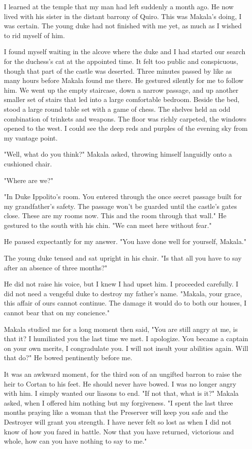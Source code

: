 \documentclass{article}
\begin{document}
I learned at the temple that my man had left suddenly a month ago. He now lived with his sister in the distant barrony of Quiro. This was Makala's doing, I was certain. The young duke had not finished with me yet, as much as I wished to rid myself of him. 

I found myself waiting in the alcove where the duke and I had started our search for the duchess's cat at the appointed time. It felt too public and conspicuous, though that part of the castle was deserted. Three minutes passed by like as many hours before Makala found me there. He gestured silently for me to follow him. We went up the empty staircase, down a narrow passage, and up another smaller set of stairs that led into a large comfortable bedroom. Beside the bed, stood a large round table set with a game of chess. The shelves held an odd combination of trinkets and weapons. The floor was richly carpeted, the windows opened to the west. I could see the deep reds and purples of the evening sky from my vantage point.

"Well, what do you think?" Makala asked, throwing himself languidly onto a cushioned chair. 

"Where are we?"

"In Duke Ippolito's room. You entered through the once secret passage built for my grandfather's safety. The passage won't be guarded until the castle's gates close. These are my rooms now. This and the room through that wall." He gestured to the south with his chin. "We can meet here without fear."

He paused expectantly for my answer. "You have done well for yourself, Makala."

The young duke tensed and sat upright in his chair. "Is that all you have to say after an absence of three months?"

He did not raise his voice, but I knew I had upset him. I proceeded carefully. I did not need a vengeful duke to destroy my father's name. "Makala, your grace, this affair of ours cannot continue. The damage it would do to both our houses, I cannot bear that on my concience."

Makala studied me for a long moment then said, "You are still angry at me, is that it? I humiliated you the last time we met. I apologize. You became a captain on your own merits, I congradulate you. I will not insult your abilities again. Will that do?" He bowed pentinently before me. 

It was an awkward moment, for the third son of an ungifted barron to raise the heir to Cortan to his feet. He should never have bowed. I was no longer angry with him. I simply wanted our liasons to end. "If not that, what is it?" Makala asked, when I offered him nothing but my forgiveness. "I spent the last three months praying like a woman that the Preserver will keep you safe and the Destroyer will grant you strength. I have never felt so lost as when I did not know of how you fared in battle. Now that you have returned, victorious and whole, how can you have nothing to say to me."
\end{document}
